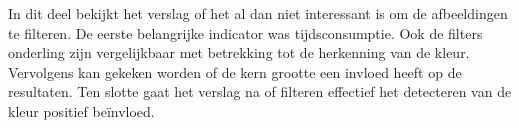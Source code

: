 In dit deel bekijkt het verslag of het al dan niet interessant is om de afbeeldingen te filteren. De eerste belangrijke indicator was tijdsconsumptie. Ook de filters onderling zijn vergelijkbaar met betrekking tot de herkenning van de kleur. Vervolgens kan gekeken worden of de kern grootte een invloed heeft op de resultaten. Ten slotte gaat het verslag na of filteren effectief het detecteren van de kleur positief beïnvloed. 